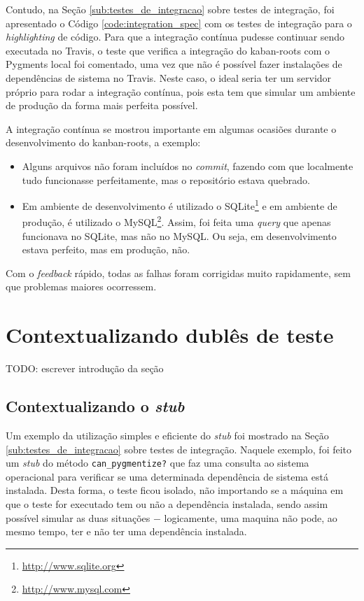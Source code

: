 Contudo, na Seção \ref{sub:testes_de_integracao} sobre testes de integração, foi apresentado o Código \ref{code:integration_spec} com os testes de integração para o \textit{highlighting} de código. Para que a integração contínua pudesse continuar sendo executada no Travis, o teste que verifica a integração do kaban-roots com o Pygments local foi comentado, uma vez que não é possível fazer instalações de dependências de sistema no Travis. Neste caso, o ideal seria ter um servidor próprio para rodar a integração contínua, pois esta tem que simular um ambiente de produção da forma mais perfeita possível.

A integração contínua se mostrou importante em algumas ocasiões durante o desenvolvimento do kanban-roots, a exemplo:

\begin{itemize}
  \item Alguns arquivos não foram incluídos no \textit{commit}, fazendo com que localmente tudo funcionasse perfeitamente, mas o repositório estava quebrado.
  \item Em ambiente de desenvolvimento é utilizado o SQLite\footnote{\url{http://www.sqlite.org}} e em ambiente de produção, é utilizado o MySQL\footnote{\url{http://www.mysql.com}}. Assim, foi feita uma \textit{query} que apenas funcionava no SQLite, mas não no MySQL. Ou seja, em desenvolvimento estava perfeito, mas em produção, não.
\end{itemize}

Com o \textit{feedback} rápido, todas as falhas foram corrigidas muito rapidamente, sem que problemas maiores ocorressem.


\section{Contextualizando dublês de teste}

TODO: escrever introdução da seção

\subsection{Contextualizando o \textit{stub}}
\label{sub:contextualizando_o_stub}

Um exemplo da utilização simples e eficiente do \textit{stub} foi mostrado na Seção \ref{sub:testes_de_integracao} sobre testes de integração. Naquele exemplo, foi feito um \textit{stub} do método \texttt{can\_pygmentize?} que faz uma consulta ao sistema operacional para verificar se uma determinada dependência de sistema está instalada. Desta forma, o teste ficou isolado, não importando se a máquina em que o teste for executado tem ou não a dependência instalada, sendo assim possível simular as duas situações $-$ logicamente, uma maquina não pode, ao mesmo tempo, ter e não ter uma dependência instalada.

